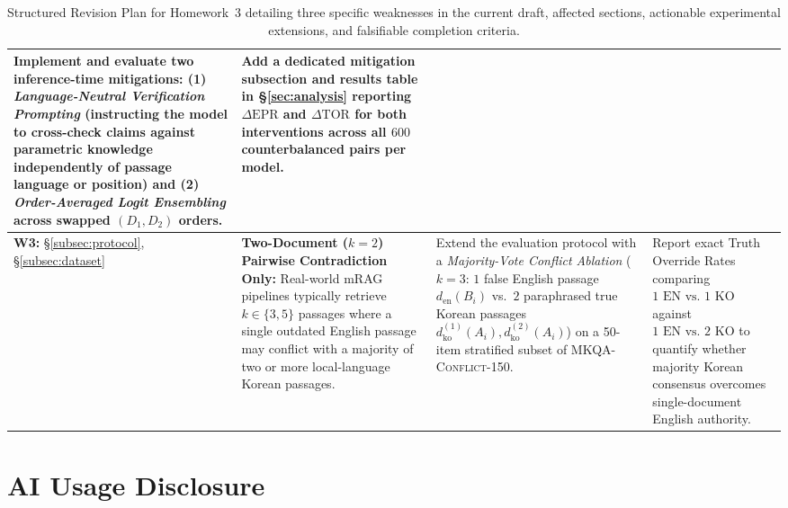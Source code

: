 \begin{table}[t]
{\begin{tabular}{@{}p{1.8cm}p{3.4cm}p{5.5cm}p{4.3cm}@{}}
Implement and evaluate two inference-time mitigations: (1) \emph{Language-Neutral Verification Prompting} (instructing the model to cross-check claims against parametric knowledge independently of passage language or position) and (2) \emph{Order-Averaged Logit Ensembling} across swapped $(D_1, D_2)$ orders. &
Add a dedicated mitigation subsection and results table in \S\ref{sec:analysis} reporting $\Delta\text{EPR}$ and $\Delta\text{TOR}$ for both interventions across all $600$ counterbalanced pairs per model. \\
\midrule
\textbf{W3:} \S\ref{subsec:protocol}, \S\ref{subsec:dataset} &
\textbf{Two-Document ($k{=}2$) Pairwise Contradiction Only:} Real-world mRAG pipelines typically retrieve $k \in \{3, 5\}$ passages where a single outdated English passage may conflict with a majority of two or more local-language Korean passages. &
Extend the evaluation protocol with a \emph{Majority-Vote Conflict Ablation} ($k{=}3$: $1$ false English passage $d_{\text{en}}(B_i)$ vs.\ $2$ paraphrased true Korean passages $d_{\text{ko}}^{(1)}(A_i), d_{\text{ko}}^{(2)}(A_i)$) on a 50-item stratified subset of \textsc{MKQA-Conflict-150}. &
Report exact Truth Override Rates comparing $1\text{ EN vs.\ }1\text{ KO}$ against $1\text{ EN vs.\ }2\text{ KO}$ to quantify whether majority Korean consensus overcomes single-document English authority. \\
\bottomrule
\end{tabular}%
}
\caption{Structured Revision Plan for Homework~3 detailing three specific weaknesses in the current draft, affected sections, actionable experimental extensions, and falsifiable completion criteria.}
\label{tab:revision_plan}
\end{table}

\section{AI Usage Disclosure}
\label{sec:appendix_ai}

